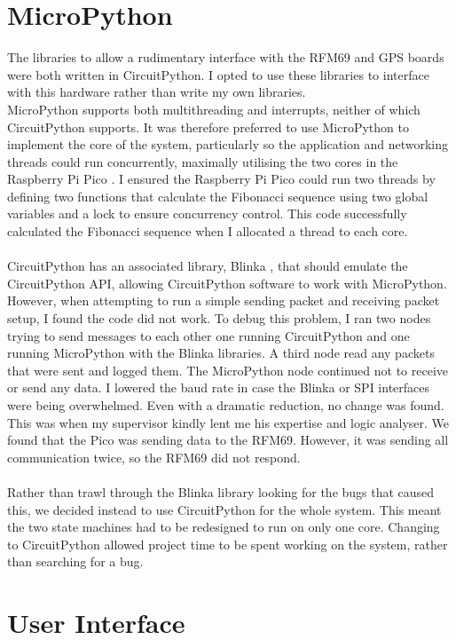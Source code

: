 \documentclass[12pt,a4paper]{report}
\begin{document}
 
\section{MicroPython}
The libraries to allow a rudimentary interface with the RFM69 and GPS boards were both written in CircuitPython. I opted to use these libraries to interface with this hardware rather than write my own libraries. \\ 
MicroPython supports both multithreading and interrupts, neither of which CircuitPython supports. It was therefore preferred to use MicroPython to implement the core of the system, particularly so the application and networking threads could run concurrently, maximally utilising the two cores in the Raspberry Pi Pico \cite{rp2040}. I ensured the Raspberry Pi Pico could run two threads by defining two functions that calculate the Fibonacci sequence using two global variables and a lock to ensure concurrency control. This code successfully calculated the Fibonacci sequence when I allocated a thread to each core. \\ \\ 
CircuitPython has an associated library, Blinka \cite{blinka}, that should emulate the CircuitPython API, allowing CircuitPython software to work with MicroPython. However, when attempting to run a simple sending packet and receiving packet setup, I found the code did not work. To debug this problem, I ran two nodes trying to send messages to each other one running CircuitPython and one running MicroPython with the Blinka libraries. A third node read any packets that were sent and logged them. The MicroPython node continued not to receive or send any data. I lowered the baud rate in case the Blinka or SPI interfaces were being overwhelmed. Even with a dramatic reduction, no change was found. \\
This was when my supervisor kindly lent me his expertise and logic analyser. We found that the Pico was sending data to the RFM69. However, it was sending all communication twice, so the RFM69 did not respond. \\ \\
Rather than trawl through the Blinka library looking for the bugs that caused this, we decided instead to use CircuitPython for the whole system. This meant the two state machines had to be redesigned to run on only one core. Changing to CircuitPython allowed project time to be spent working on the system, rather than searching for a bug. 


\section{User Interface}
\end{document}
